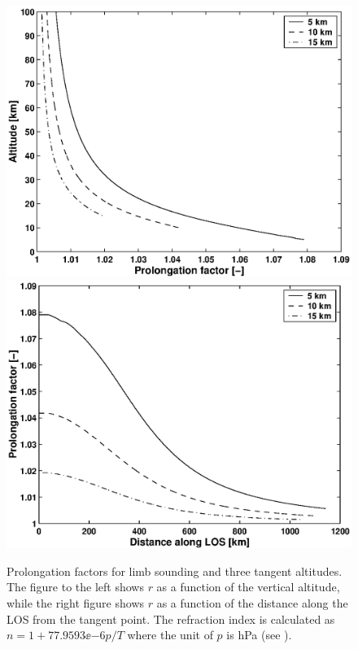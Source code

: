   \begin{figure}
   \begin{center}
    \includegraphics*[width=0.49\hsize]{Figs/fig_pfac_z.eps}
    \includegraphics*[width=0.46\hsize]{Figs/fig_pfac_l.eps}
     \caption{Prolongation factors for limb sounding and three tangent
              altitudes. The figure to the left shows $r$ as a function
              of the vertical altitude, while the right figure shows $r$ as 
              a function of the distance along the LOS from the tangent point.
              The refraction index is calculated as $n=1+77.9593\ee{-6}p/T$
              where the unit of $p$ is hPa (see \citet{elgered:93}).}
    \label{fig:los:pfac}
   \end{center} 
  \end{figure}



